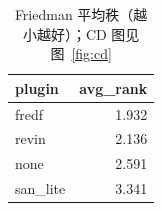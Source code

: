 \begin{table}[htbp]
\centering
\small
\caption{Friedman 平均秩（越小越好）；CD 图见图~\ref{fig:cd}}
\label{tab:stats_ranks}
\begin{tabular}{lr}
\toprule
plugin & avg\_rank \\
\midrule
fredf & 1.932 \\
revin & 2.136 \\
none & 2.591 \\
san\_lite & 3.341 \\
\bottomrule
\end{tabular}
\end{table}
